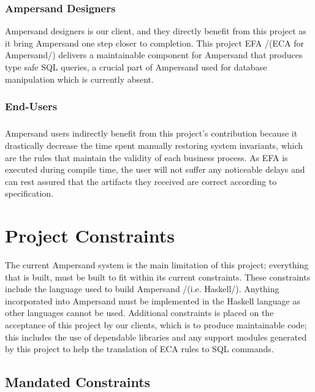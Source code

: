 \documentclass[12pt]{report}
\begin{document}
\subsection{Ampersand Designers}\label{subsec:Ampersand}
Ampersand designers is our client, and they directly benefit from this project 
as it bring Ampersand one step closer to completion. This project EFA /(ECA for 
Ampersand/) delivers a maintainable component for Ampersand that produces type 
safe SQL queries, a crucial part of Ampersand used for database manipulation 
which is currently absent. 

\subsection{End-Users}\label{subsec:BusReq}
\paragraph{}
Ampersand users indirectly benefit from this project's contribution because it 
drastically decrease the time spent manually restoring system invariants, which 
are the rules that maintain the validity of each business process. As EFA is 
executed during compile time, the user will not suffer any noticeable delays 
and can rest assured that the artifacts they received are correct according to 
specification.

\chapter{Project Constraints}\label{ch:Constraints}
The current Ampersand system is the main limitation of this project; everything 
that is built, must be built to fit within its current constraints. These 
constraints include the language used to build Ampersand /(i.e. Haskell/). 
Anything incorporated into Ampersand must be implemented in the Haskell 
language as other languages cannot be used. Additional constraints is placed on 
the acceptance of this project by our clients, which is to produce maintainable 
code; this includes the use of dependable libraries and any support modules 
generated by this project to help the translation of ECA rules to SQL commands.

\section{Mandated Constraints}\label{sec:Constraints}
\end{document}
